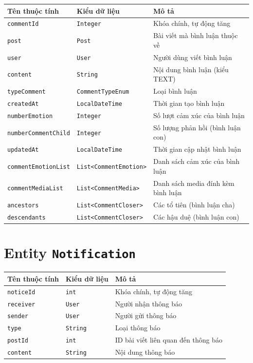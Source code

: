 \begin{longtable}{|>{\raggedright\arraybackslash}p{4cm}|>{\raggedright\arraybackslash}p{4cm}|>{\raggedright\arraybackslash}p{6cm}|}
\hline
\textbf{Tên thuộc tính} & \textbf{Kiểu dữ liệu} & \textbf{Mô tả} \\
\hline
\texttt{commentId} & \texttt{Integer} & Khóa chính, tự động tăng \\
\hline
\texttt{post} & \texttt{Post} & Bài viết mà bình luận thuộc về \\
\hline
\texttt{user} & \texttt{User} & Người dùng viết bình luận \\
\hline
\texttt{content} & \texttt{String} & Nội dung bình luận (kiểu TEXT) \\
\hline
\texttt{typeComment} & \texttt{CommentTypeEnum} & Loại bình luận \\
\hline
\texttt{createdAt} & \texttt{LocalDateTime} & Thời gian tạo bình luận \\
\hline
\texttt{numberEmotion} & \texttt{Integer} & Số lượt cảm xúc của bình luận \\
\hline
\texttt{numberCommentChild} & \texttt{Integer} & Số lượng phản hồi (bình luận con) \\
\hline
\texttt{updatedAt} & \texttt{LocalDateTime} & Thời gian cập nhật bình luận \\
\hline
\texttt{commentEmotionList} & \texttt{List<CommentEmotion>} & Danh sách cảm xúc của bình luận \\
\hline
\texttt{commentMediaList} & \texttt{List<CommentMedia>} & Danh sách media đính kèm bình luận \\
\hline
\texttt{ancestors} & \texttt{List<CommentCloser>} & Các tổ tiên (bình luận cha) \\
\hline
\texttt{descendants} & \texttt{List<CommentCloser>} & Các hậu duệ (bình luận con) \\
\hline
\end{longtable}


\section{Entity \texttt{Notification}}

\begin{longtable}{|>{\raggedright\arraybackslash}p{4cm}|>{\raggedright\arraybackslash}p{4cm}|>{\raggedright\arraybackslash}p{6cm}|}
\hline
\textbf{Tên thuộc tính} & \textbf{Kiểu dữ liệu} & \textbf{Mô tả} \\
\hline
\texttt{noticeId} & \texttt{int} & Khóa chính, tự động tăng \\
\hline
\texttt{receiver} & \texttt{User} & Người nhận thông báo \\
\hline
\texttt{sender} & \texttt{User} & Người gửi thông báo \\
\hline
\texttt{type} & \texttt{String} & Loại thông báo \\
\hline
\texttt{postId} & \texttt{int} & ID bài viết liên quan đến thông báo \\
\hline
\texttt{content} & \texttt{String} & Nội dung thông báo \\
\hline
\end{longtable}

